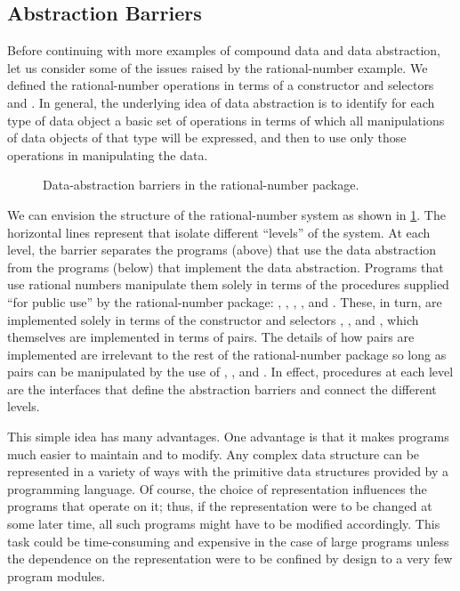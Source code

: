 \subsection{Abstraction Barriers}
\label{Section 2.1.2}

Before continuing with more examples of compound data and data abstraction, let us consider some of the issues raised by the rational-number example.
We defined the rational-number operations in terms of a constructor  and selectors  and .
In general, the underlying idea of data abstraction is to identify for each type of data object a basic set of operations in terms of which all manipulations of data objects of that type will be expressed, and then to use only those operations in manipulating the data.

\begin{figure}[tb]
	\centering
	
	\caption{
		Data-abstraction barriers in the rational-number package.
	}
	\label{Figure 2.1}
\end{figure}

We can envision the structure of the rational-number system as shown in \cref{Figure 2.1}.
The horizontal lines represent  that isolate different “levels” of the system.
At each level, the barrier separates the programs (above) that use the data abstraction from the programs (below) that implement the data abstraction.
Programs that use rational numbers manipulate them solely in terms of the procedures supplied “for public use” by the rational-number package:
, , , , and .
These, in turn, are implemented solely in terms of the constructor and selectors , , and , which themselves are implemented in terms of pairs.
The details of how pairs are implemented are irrelevant to the rest of the rational-number package so long as pairs can be manipulated by the use of , , and .
In effect, procedures at each level are the interfaces that define the abstraction barriers and connect the different levels.

This simple idea has many advantages.
One advantage is that it makes programs much easier to maintain and to modify.
Any complex data structure can be represented in a variety of ways with the primitive data structures provided by a programming language.
Of course, the choice of representation influences the programs that operate on it;
thus, if the representation were to be changed at some later time, all such programs might have to be modified accordingly.
This task could be time-consuming and expensive in the case of large programs unless the dependence on the representation were to be confined by design to a very few program modules.

